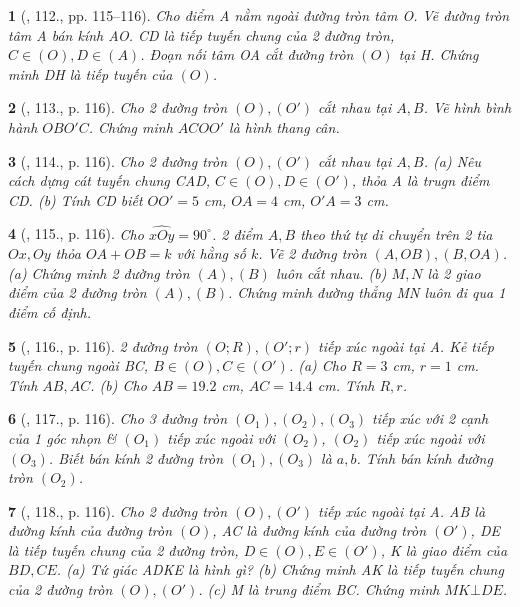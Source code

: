 \documentclass{article}
\newtheorem{baitoan}{}
\begin{document}
\begin{baitoan}[\cite{Binh_Toan_9_tap_1}, 112., pp. 115--116]
	Cho điểm A nằm ngoài đường tròn tâm O. Vẽ đường tròn tâm A bán kính AO. CD là tiếp tuyến chung của 2 đường tròn, $C\in(O),D\in(A)$. Đoạn nối tâm OA cắt đường tròn $(O)$ tại H. Chứng minh DH là tiếp tuyến của $(O)$.
\end{baitoan}

\begin{baitoan}[\cite{Binh_Toan_9_tap_1}, 113., p. 116]
	Cho 2 đường tròn $(O),(O')$ cắt nhau tại $A,B$. Vẽ hình bình hành $OBO'C$. Chứng minh $ACOO'$ là hình thang cân.
\end{baitoan}

\begin{baitoan}[\cite{Binh_Toan_9_tap_1}, 114., p. 116]
	Cho 2 đường tròn $(O),(O')$ cắt nhau tại $A,B$. (a) Nêu cách dựng cát tuyến chung CAD, $C\in(O),D\in(O')$, thỏa A là trugn điểm CD. (b) Tính CD biết $OO' = 5$ {\rm cm}, $OA = 4$ {\rm cm}, $O'A = 3$ {\rm cm}.
\end{baitoan}

\begin{baitoan}[\cite{Binh_Toan_9_tap_1}, 115., p. 116]
	Cho $\widehat{xOy} = 90^\circ$. 2 điểm $A,B$ theo thứ tự di chuyển trên 2 tia $Ox,Oy$ thỏa $OA + OB = k$ với hằng số $k$. Vẽ 2 đường tròn $(A,OB),(B,OA)$. (a) Chứng minh 2 đường tròn $(A),(B)$ luôn cắt nhau. (b) $M,N$ là 2 giao điểm của 2 đường tròn $(A),(B)$. Chứng minh đường thẳng MN luôn đi qua 1 điểm cố định.
\end{baitoan}

\begin{baitoan}[\cite{Binh_Toan_9_tap_1}, 116., p. 116]
	2 đường tròn $(O;R),(O';r)$ tiếp xúc ngoài tại A. Kẻ tiếp tuyến chung ngoài BC, $B\in(O),C\in(O')$. (a) Cho $R = 3$ {\rm cm}, $r = 1$ {\rm cm}. Tính $AB,AC$. (b) Cho $AB = 19.2$ {\rm cm}, $AC = 14.4$ {\rm cm}. Tính $R,r$.
\end{baitoan}

\begin{baitoan}[\cite{Binh_Toan_9_tap_1}, 117., p. 116]
	Cho 3 đường tròn $(O_1),(O_2),(O_3)$ tiếp xúc với 2 cạnh của 1 góc nhọn \& $(O_1)$ tiếp xúc ngoài với $(O_2)$, $(O_2)$ tiếp xúc ngoài với $(O_3)$. Biết bán kính 2 đường tròn $(O_1),(O_3)$ là $a,b$. Tính bán kính đường tròn $(O_2)$.
\end{baitoan}

\begin{baitoan}[\cite{Binh_Toan_9_tap_1}, 118., p. 116]
	Cho 2 đường tròn $(O),(O')$ tiếp xúc ngoài tại A. AB là đường kính của đường tròn $(O)$, AC là đường kính của đường tròn $(O')$, DE là tiếp tuyến chung của 2 đường tròn, $D\in(O),E\in(O')$, K là giao điểm của $BD,CE$. (a) Tứ giác ADKE là hình gì? (b) Chứng minh AK là tiếp tuyến chung của 2 đường tròn $(O),(O')$. (c) M là trung điểm BC. Chứng minh $MK\bot DE$.
\end{baitoan}
\end{document}
